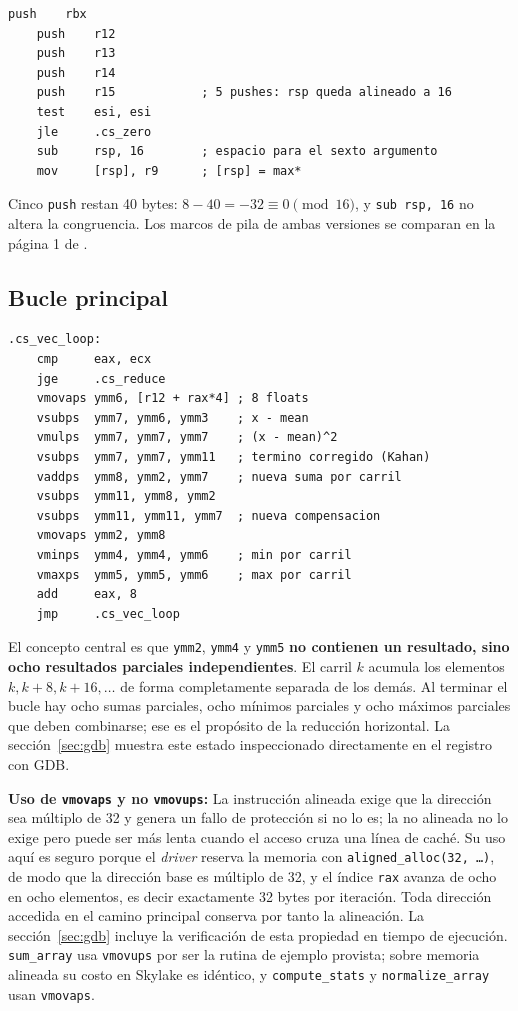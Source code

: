\documentclass[journal]{IEEEtran}
\begin{document}
\begin{lstlisting}[caption={Prólogo vectorial de \texttt{compute\_stats}:
  cinco \texttt{push} y \texttt{max*} en la pila.}, label={lst:prologo-vec}]
    push    rbx
    push    r12
    push    r13
    push    r14
    push    r15            ; 5 pushes: rsp queda alineado a 16
    test    esi, esi
    jle     .cs_zero
    sub     rsp, 16        ; espacio para el sexto argumento
    mov     [rsp], r9      ; [rsp] = max*
\end{lstlisting}

Cinco \texttt{push} restan 40 bytes: $8 - 40 = -32 \equiv 0 \pmod{16}$,
y \texttt{sub rsp, 16} no altera la congruencia. Los marcos de pila de
ambas versiones se comparan en la página 1 de \archdiag.

\subsection{Bucle principal}

\begin{lstlisting}[caption={Núcleo vectorizado: ocho elementos por
  iteración con tres acumuladores en paralelo.}, label={lst:vec-loop}]
.cs_vec_loop:
    cmp     eax, ecx
    jge     .cs_reduce
    vmovaps ymm6, [r12 + rax*4] ; 8 floats
    vsubps  ymm7, ymm6, ymm3    ; x - mean
    vmulps  ymm7, ymm7, ymm7    ; (x - mean)^2
    vsubps  ymm7, ymm7, ymm11   ; termino corregido (Kahan)
    vaddps  ymm8, ymm2, ymm7    ; nueva suma por carril
    vsubps  ymm11, ymm8, ymm2
    vsubps  ymm11, ymm11, ymm7  ; nueva compensacion
    vmovaps ymm2, ymm8
    vminps  ymm4, ymm4, ymm6    ; min por carril
    vmaxps  ymm5, ymm5, ymm6    ; max por carril
    add     eax, 8
    jmp     .cs_vec_loop
\end{lstlisting}

El concepto central es que \texttt{ymm2}, \texttt{ymm4} y \texttt{ymm5}
\textbf{no contienen un resultado, sino ocho resultados parciales
independientes}. El carril $k$ acumula los elementos
$k, k+8, k+16, \dots$ de forma completamente separada de los demás. Al
terminar el bucle hay ocho sumas parciales, ocho mínimos parciales y
ocho máximos parciales que deben combinarse; ese es el propósito de la
reducción horizontal. La sección~\ref{sec:gdb} muestra este estado
inspeccionado directamente en el registro con GDB.

\textbf{Uso de \texttt{vmovaps} y no \texttt{vmovups}:} La instrucción
alineada exige que la dirección sea múltiplo de 32 y genera un fallo
de protección si no lo es; la no alineada no lo exige pero puede ser
más lenta cuando el acceso cruza una línea de caché. Su uso aquí
es seguro porque el \textit{driver} reserva la memoria con
\texttt{aligned\_alloc(32, \dots)}, de modo que la dirección base es
múltiplo de 32, y el índice \texttt{rax} avanza de ocho en ocho
elementos, es decir exactamente 32 bytes por iteración. Toda dirección
accedida en el camino principal conserva por tanto la alineación. La
sección~\ref{sec:gdb} incluye la verificación de esta propiedad en
tiempo de ejecución. \texttt{sum\_array} usa \texttt{vmovups} por ser la rutina de ejemplo
provista; sobre memoria alineada su costo en Skylake es idéntico, y
\texttt{compute\_stats} y \texttt{normalize\_array} usan \texttt{vmovaps}.
\end{document}
